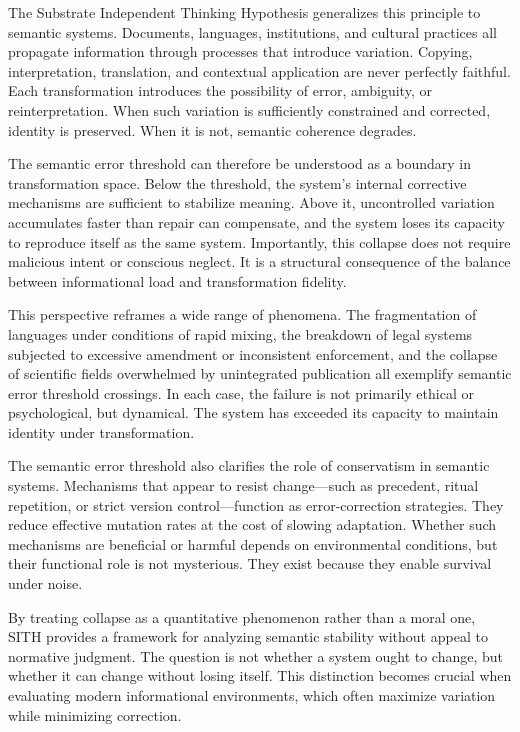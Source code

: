 \documentclass[11pt,oneside]{article}
\begin{document}
The Substrate Independent Thinking Hypothesis generalizes this principle to semantic systems. Documents, languages, institutions, and cultural practices all propagate information through processes that introduce variation. Copying, interpretation, translation, and contextual application are never perfectly faithful. Each transformation introduces the possibility of error, ambiguity, or reinterpretation. When such variation is sufficiently constrained and corrected, identity is preserved. When it is not, semantic coherence degrades.

The semantic error threshold can therefore be understood as a boundary in transformation space. Below the threshold, the system’s internal corrective mechanisms are sufficient to stabilize meaning. Above it, uncontrolled variation accumulates faster than repair can compensate, and the system loses its capacity to reproduce itself as the same system. Importantly, this collapse does not require malicious intent or conscious neglect. It is a structural consequence of the balance between informational load and transformation fidelity.

This perspective reframes a wide range of phenomena. The fragmentation of languages under conditions of rapid mixing, the breakdown of legal systems subjected to excessive amendment or inconsistent enforcement, and the collapse of scientific fields overwhelmed by unintegrated publication all exemplify semantic error threshold crossings. In each case, the failure is not primarily ethical or psychological, but dynamical. The system has exceeded its capacity to maintain identity under transformation.

The semantic error threshold also clarifies the role of conservatism in semantic systems. Mechanisms that appear to resist change—such as precedent, ritual repetition, or strict version control—function as error-correction strategies. They reduce effective mutation rates at the cost of slowing adaptation. Whether such mechanisms are beneficial or harmful depends on environmental conditions, but their functional role is not mysterious. They exist because they enable survival under noise.

By treating collapse as a quantitative phenomenon rather than a moral one, SITH provides a framework for analyzing semantic stability without appeal to normative judgment. The question is not whether a system ought to change, but whether it can change without losing itself. This distinction becomes crucial when evaluating modern informational environments, which often maximize variation while minimizing correction.
\end{document}
